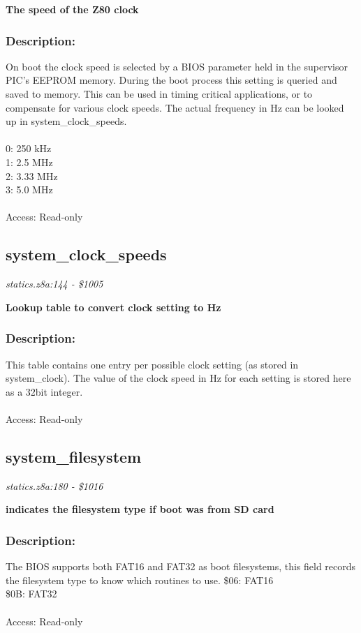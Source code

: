 \noindent
\textbf{The speed of the Z80 clock}

\subsubsection{Description:}
 On boot the clock speed is selected by a BIOS parameter held in the supervisor PIC's EEPROM memory.  During the boot process this setting is  queried and saved to memory.  This can be used in timing critical applications, or to compensate for various clock speeds.  The actual frequency in Hz can be looked up in system\_clock\_speeds.\\\\ 0: 250 kHz\\ 1: 2.5 MHz\\ 2: 3.33 MHz\\ 3: 5.0 MHz\\\\ Access: Read-only

\subsection{system\_clock\_speeds}
\textit{statics.z8a:144 - \$1005}

\noindent
\textbf{Lookup table to convert clock setting to Hz}

\subsubsection{Description:}
 This table contains one entry per possible clock setting (as stored in system\_clock).  The value of the clock speed in Hz for each setting is stored here as a 32bit integer.\\\\ Access: Read-only

\subsection{system\_filesystem}
\textit{statics.z8a:180 - \$1016}

\noindent
\textbf{indicates the filesystem type if boot was from SD card}

\subsubsection{Description:}
 The BIOS supports both FAT16 and FAT32 as boot filesystems, this field records the filesystem type to know which routines to use. \$06: FAT16\\ \$0B: FAT32\\\\ Access: Read-only

